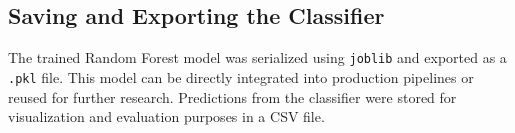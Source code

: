 \documentclass[a4paper,12pt,twoside]{scrreprt}
\begin{document}








\subsection{Saving and Exporting the Classifier}

The trained Random Forest model was serialized using \texttt{joblib} and
exported as a \texttt{.pkl} file. This model can be directly
integrated into production pipelines or reused for further research.
Predictions from the classifier were stored for visualization and evaluation
purposes in a CSV file.
\end{document}
